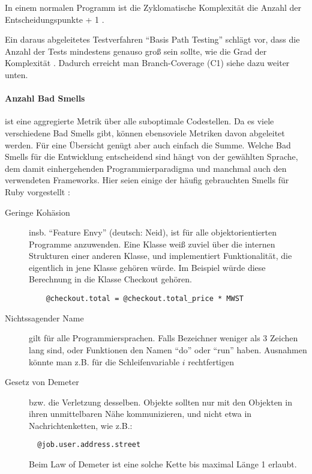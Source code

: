 In einem normalen Programm ist die Zyklomatische Komplexität die Anzahl der Entscheidungspunkte + 1 \citep[S. 314]{mccabe_complexity_1976}.

Ein daraus abgeleitetes Testverfahren "`Basis Path Testing"' schlägt vor, dass die Anzahl der Tests mindestens genauso groß sein sollte, wie die Grad der Komplexität \citep[S. 318]{mccabe_complexity_1976}. Dadurch erreicht man Branch-Coverage (C1) siehe dazu weiter unten.

\paragraph{Anzahl Bad Smells} ist eine aggregierte Metrik über alle suboptimale Codestellen. Da es viele verschiedene Bad Smells gibt, können ebensoviele Metriken davon abgeleitet werden. Für eine Übersicht genügt aber auch einfach die Summe. Welche Bad Smells für die Entwicklung entscheidend sind hängt von der gewählten Sprache, dem damit einhergehenden Programmierparadigma und manchmal auch den verwendeten Frameworks. Hier seien einige der häufig gebrauchten Smells für Ruby vorgestellt \citep{kevin_rutherford_code_2010}:

\begin{description}
 \item[Geringe Kohäsion] insb. "`Feature Envy"' (deutsch: Neid), ist für alle objektorientierten Programme anzuwenden. Eine Klasse weiß zuviel über die internen Strukturen einer anderen Klasse, und implementiert Funktionalität, die eigentlich in jene Klasse gehören würde. Im Beispiel würde diese Berechnung in die Klasse Checkout gehören.
 \begin{lstlisting}
    @checkout.total = @checkout.total_price * MWST
 \end{lstlisting}
 \item[Nichtssagender Name] gilt für alle Programmiersprachen. Falls Bezeichner weniger als 3 Zeichen lang sind, oder Funktionen den Namen "`do"' oder "`run"' haben. Ausnahmen könnte man z.B. für die Schleifenvariable $i$ rechtfertigen
 \item[Gesetz von Demeter] bzw. die Verletzung desselben. Objekte sollten nur mit den Objekten in ihren unmittelbaren Nähe kommunizieren, und nicht etwa in Nachrichtenketten, wie z.B.:
 \begin{lstlisting}
  @job.user.address.street
 \end{lstlisting}
 Beim Law of Demeter ist eine solche Kette bis maximal Länge 1 erlaubt.

 \end{description}

